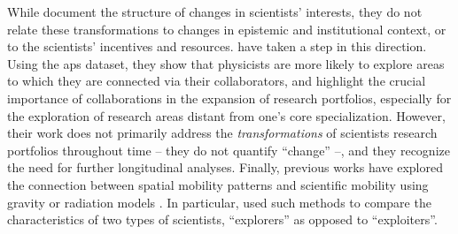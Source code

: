 \documentclass{article}
\begin{document}
While \citep{Jia2017,Aleta2019,Zeng2019} document the structure of changes in scientists' interests, they do not relate these transformations to changes in epistemic and institutional context, or to the scientists' incentives and resources. %
\citet{Tripodi2020} have taken a step in this direction. Using the \gls{aps} dataset, they show that physicists are more likely to explore areas to which they are connected via their collaborators, and highlight the crucial importance of collaborations in the expansion of research portfolios, especially for the exploration of research areas distant from one's core specialization. %
However, their work does not primarily address the \textit{transformations} of scientists research portfolios throughout time -- they do not quantify ``change'' --, and they recognize the need for further longitudinal analyses. Finally, previous works have explored the connection between spatial mobility patterns and scientific mobility using gravity or radiation models \citep{Singh2024,liu2024science}. In particular, \citealt{Singh2024} used such methods to compare the characteristics of two types of scientists, ``explorers'' as opposed to ``exploiters''.
\end{document}
